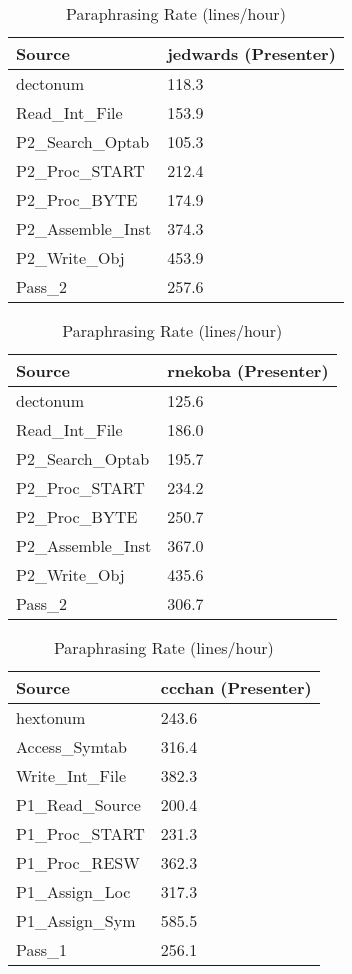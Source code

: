
\begin{table}[hb]
\begin{center}
\begin{tabular}{|l|l|}
\hline
Source & jedwards (Presenter)\\
\hline
dectonum & 118.3\\
Read\_Int\_File & 153.9\\
P2\_Search\_Optab & 105.3\\
P2\_Proc\_START & 212.4\\
P2\_Proc\_BYTE & 174.9\\
P2\_Assemble\_Inst & 374.3\\
P2\_Write\_Obj & 453.9\\
Pass\_2 & 257.6\\
\hline
\end{tabular}
\end{center}
\caption{Paraphrasing Rate (lines/hour)}
\end{table}


\begin{table}[hb]
\begin{center}
\begin{tabular}{|l|l|}
\hline
Source & rnekoba (Presenter)\\
\hline
dectonum & 125.6\\
Read\_Int\_File & 186.0\\
P2\_Search\_Optab & 195.7\\
P2\_Proc\_START & 234.2\\
P2\_Proc\_BYTE & 250.7\\
P2\_Assemble\_Inst & 367.0\\
P2\_Write\_Obj & 435.6\\
Pass\_2 & 306.7\\
\hline
\end{tabular}
\end{center}
\caption{Paraphrasing Rate (lines/hour)}
\end{table}


\begin{table}[hb]
\begin{center}
\begin{tabular}{|l|l|}
\hline
Source & ccchan (Presenter)\\
\hline
hextonum & 243.6\\
Access\_Symtab & 316.4\\
Write\_Int\_File & 382.3\\
P1\_Read\_Source & 200.4\\
P1\_Proc\_START & 231.3\\
P1\_Proc\_RESW & 362.3\\
P1\_Assign\_Loc & 317.3\\
P1\_Assign\_Sym & 585.5\\
Pass\_1 & 256.1\\
\hline
\end{tabular}
\end{center}
\caption{Paraphrasing Rate (lines/hour)}
\end{table}



